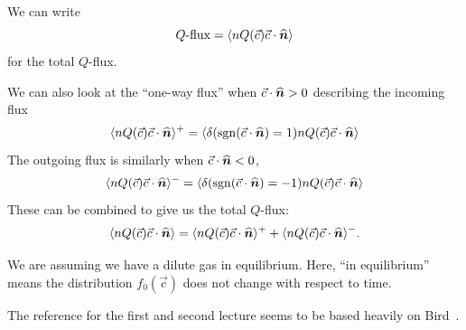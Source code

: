 \begin{node}
We can write 
\begin{equation}
\mbox{$Q$-flux}=\langle nQ(\vec{c})\vec{c}\cdot\widehat{\boldsymbol{n}}\rangle
\end{equation}
for the total $Q$-flux.

We can also look at the ``one-way flux'' when $\vec{c}\cdot\widehat{\boldsymbol{n}}>0$
describing the incoming flux
\begin{equation}
\langle nQ(\vec{c})\vec{c}\cdot\widehat{\boldsymbol{n}}\rangle^{+}
=\langle\delta(\operatorname{sgn}(\vec{c}\cdot\widehat{\boldsymbol{n}})=1)nQ(\vec{c})\vec{c}\cdot\widehat{\boldsymbol{n}}\rangle
\end{equation}
The outgoing flux is similarly when $\vec{c}\cdot\widehat{\boldsymbol{n}}<0$,
\begin{equation}
\langle nQ(\vec{c})\vec{c}\cdot\widehat{\boldsymbol{n}}\rangle^{-}
=\langle\delta(\operatorname{sgn}(\vec{c}\cdot\widehat{\boldsymbol{n}})=-1)nQ(\vec{c})\vec{c}\cdot\widehat{\boldsymbol{n}}\rangle
\end{equation}
These can be combined to give us the total $Q$-flux:
\begin{equation}
\langle nQ(\vec{c})\vec{c}\cdot\widehat{\boldsymbol{n}}\rangle
=\langle nQ(\vec{c})\vec{c}\cdot\widehat{\boldsymbol{n}}\rangle^{+}
+\langle nQ(\vec{c})\vec{c}\cdot\widehat{\boldsymbol{n}}\rangle^{-}.
\end{equation}
\end{node}

\begin{remark}
We are assuming we have a dilute gas in equilibrium. Here, ``in equilibrium''
means the distribution $f_{0}(\vec{c})$ does not change with respect
to time.
\end{remark}

\begin{remark}
The reference for the first and second lecture seems to be based
heavily on Bird~\cite[Ch~1~\&~3]{bird1976molecular}.
\end{remark}
